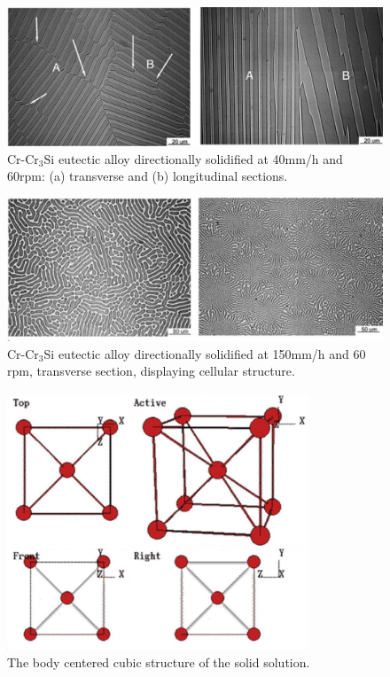 \vspace{-.8cm} 
%
\begin{figure}[H]
\begin{center}
\includegraphics[width=14cm]{DS_Cr-Cr3Si}
\caption{Cr-Cr$_3$Si eutectic alloy directionally solidified at 40mm/h and 60rpm: (a) transverse and (b) longitudinal sections.}\label{fig:DS_Cr-Cr$_3$Si}
\end{center}
\end{figure}
\vspace{-.8cm} 
%
\begin{figure}[H]
\begin{center}
\includegraphics[width=14cm]{DS_Cr-Cr3Si_bad}
\caption{Cr-Cr$_3$Si eutectic alloy directionally solidified at 150mm/h and 60 rpm, transverse section, displaying cellular structure. }
\label{fig:DS_Cr-Cr$_3$Si_bad}
\end{center}
\end{figure} 
%
\begin{figure}[H]
\begin{center}
\includegraphics[width=9cm]{BCC}
\caption{The body centered cubic structure of the solid solution.}
\label{fig:BCC}
\end{center}
\end{figure} 
